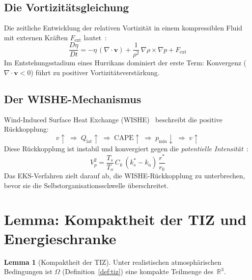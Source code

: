 ﻿\documentclass[a4paper,12pt]{article}
\theoremstyle{definition}
\newtheorem{lemma}{Lemma}
\begin{document}
\subsection{Die Vortizit\"{a}tsgleichung}

Die zeitliche Entwicklung der relativen Vortizit\"{a}t in einem kompressiblen Fluid
mit externen Kr\"{a}ften $F_{\mathrm{ext}}$ lautet~\cite{holton2004}:
\begin{equation}
\label{eq:vort}
    \frac{D\eta}{Dt} = -\eta\,(\nabla\cdot\mathbf{v})
    + \frac{1}{\rho^{2}}\,\nabla\rho\times\nabla p
    + F_{\mathrm{ext}}
\end{equation}
Im Entstehungsstadium eines Hurrikans dominiert der erste Term:
Konvergenz ($\nabla\cdot\mathbf{v}<0$) f\"{u}hrt zu positiver Vortizit\"{a}ts\-verst\"{a}rkung.

\subsection{Der WISHE-Mechanismus}

Wind-Induced Surface Heat Exchange (WISHE)~\cite{emanuel1986} beschreibt die
positive R\"{u}ckkopplung:
\[
    v\uparrow \;\Rightarrow\;
    Q_{\mathrm{lat}}\uparrow \;\Rightarrow\;
    \mathrm{CAPE}\uparrow \;\Rightarrow\;
    p_{\mathrm{min}}\downarrow \;\Rightarrow\;
    v\uparrow
\]
Diese R\"{u}ckkopplung ist instabil und konvergiert gegen die
\emph{potentielle Intensit\"{a}t}~\cite{bister2002}:
\[
    V_{p}^{2} = \frac{T_{s}}{T_{o}}\,C_{k}\,(k_{s}^{*}-k_{a})\,\frac{r^{*}}{r_{0}}
\]
Das EKS-Verfahren zielt darauf ab, die WISHE-R\"{u}ckkopplung zu unterbrechen,
bevor sie die Selbstorganisationsschwelle \"{u}berschreitet.

\section{Lemma: Kompaktheit der TIZ und Energieschranke}

\begin{lemma}[Kompaktheit der TIZ]
\label{lem:kompakt}
Unter realistischen atmosph\"{a}rischen Bedingungen ist
$\Omega$ (Definition~\ref{def:tiz}) eine kompakte Teilmenge des~$\mathbb{R}^{3}$.
\end{lemma}
\end{document}
